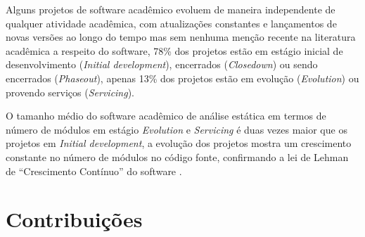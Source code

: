 Alguns projetos de software acadêmico evoluem de maneira independente
de qualquer atividade acadêmica, com atualizações constantes e lançamentos de
novas versões ao longo do tempo mas sem nenhuma menção recente na literatura
acadêmica a respeito do software, 78\% dos projetos estão em estágio inicial de
desenvolvimento ({\it Initial development}), encerrados ({\it Closedown}) ou
sendo encerrados ({\it Phaseout}), apenas 13\% dos projetos estão em evolução
({\it Evolution}) ou provendo serviços ({\it Servicing}).

O tamanho médio do software acadêmico de análise estática em termos de número
de módulos em estágio {\it Evolution} e {\it Servicing} é duas vezes maior que
os projetos em {\it Initial development}, a evolução dos projetos mostra um crescimento
constante no número de módulos no código fonte, confirmando a lei de Lehman de ``Crescimento Contínuo'' do software
\cite{lehman1997metrics}.








\section{Contribuições}

